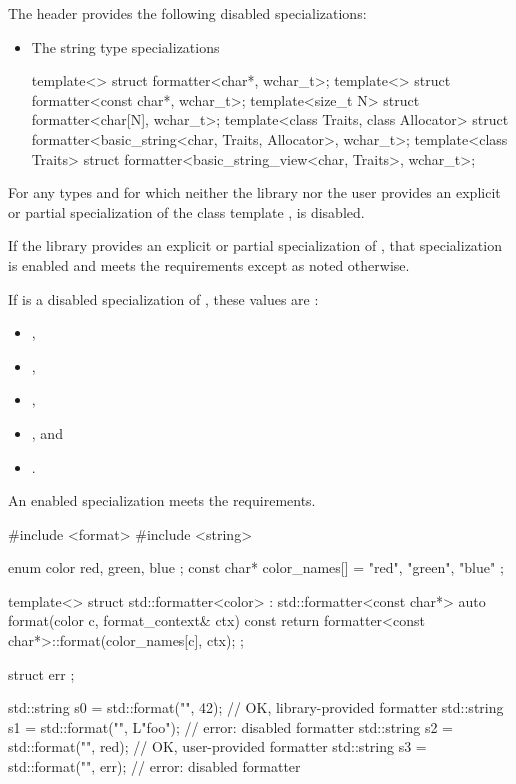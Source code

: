 \pnum
The header  provides
the following disabled specializations:
\begin{itemize}
\item
The string type specializations
\begin{codeblock}
template<> struct formatter<char*, wchar_t>;
template<> struct formatter<const char*, wchar_t>;
template<size_t N> struct formatter<char[N], wchar_t>;
template<class Traits, class Allocator>
  struct formatter<basic_string<char, Traits, Allocator>, wchar_t>;
template<class Traits>
  struct formatter<basic_string_view<char, Traits>, wchar_t>;
\end{codeblock}
\end{itemize}

\pnum
For any types  and  for which
neither the library nor the user provides
an explicit or partial specialization of
the class template ,
 is disabled.

\pnum
If the library provides an explicit or partial specialization of
, that specialization is enabled
and meets the  requirements
except as noted otherwise.

\pnum
If  is a disabled specialization of , these
values are :
\begin{itemize}
\item {},
\item {},
\item {},
\item {}, and
\item {}.
\end{itemize}

\pnum
An enabled specialization  meets the
 requirements.
\begin{example}
\begin{codeblock}
#include <format>
#include <string>

enum color { red, green, blue };
const char* color_names[] = { "red", "green", "blue" };

template<> struct std::formatter<color> : std::formatter<const char*> {
  auto format(color c, format_context& ctx) const {
    return formatter<const char*>::format(color_names[c], ctx);
  }
};

struct err {};

std::string s0 = std::format("{}", 42);         // OK, library-provided formatter
std::string s1 = std::format("{}", L"foo");     // error: disabled formatter
std::string s2 = std::format("{}", red);        // OK, user-provided formatter
std::string s3 = std::format("{}", err{});      // error: disabled formatter
\end{codeblock}
\end{example}

